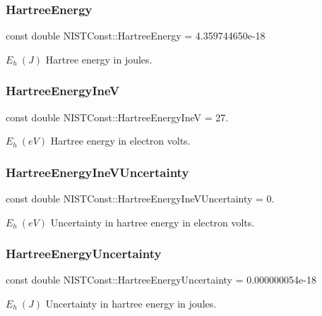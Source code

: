 \subsubsection{\texorpdfstring{Hartree\+Energy}{HartreeEnergy}}
{\footnotesize\ttfamily const double N\+I\+S\+T\+Const\+::\+Hartree\+Energy = 4.\+359744650e-\/18}

$E_h \ (J)$ Hartree energy in joules. \mbox{\label{group___hartree_energy_ga400eb5b8c9b55b0f601870ba54120364}} 
\subsubsection{\texorpdfstring{Hartree\+Energy\+IneV}{HartreeEnergyIneV}}
{\footnotesize\ttfamily const double N\+I\+S\+T\+Const\+::\+Hartree\+Energy\+IneV = 27.}

$E_h \ (eV)$ Hartree energy in electron volts. \mbox{\label{group___hartree_energy_gaa6e7ae83f510023bdd88d80dae80f97d}} 
\subsubsection{\texorpdfstring{Hartree\+Energy\+Ine\+V\+Uncertainty}{HartreeEnergyIneVUncertainty}}
{\footnotesize\ttfamily const double N\+I\+S\+T\+Const\+::\+Hartree\+Energy\+Ine\+V\+Uncertainty = 0.}

$E_h \ (eV)$ Uncertainty in hartree energy in electron volts. \mbox{\label{group___hartree_energy_gaabdf38a4c491ca0f606bf042c8479801}} 
\subsubsection{\texorpdfstring{Hartree\+Energy\+Uncertainty}{HartreeEnergyUncertainty}}
{\footnotesize\ttfamily const double N\+I\+S\+T\+Const\+::\+Hartree\+Energy\+Uncertainty = 0.\+000000054e-\/18}

$E_h \ (J)$ Uncertainty in hartree energy in joules. 